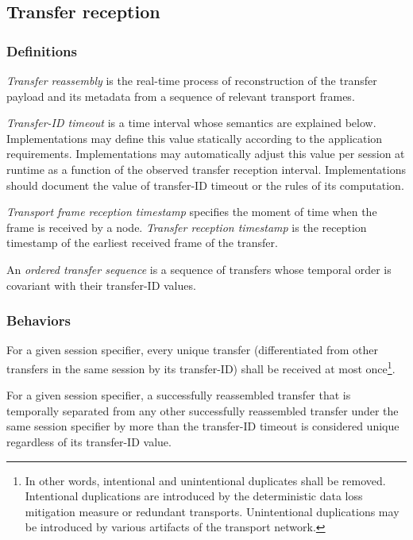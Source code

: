 \subsection{Transfer reception}\label{sec:transport_transfer_reception}

\subsubsection{Definitions}

\emph{Transfer reassembly} is the real-time process of reconstruction of the transfer payload and its metadata from
a sequence of relevant transport frames.

\emph{Transfer-ID timeout} is a time interval whose semantics are explained below.
Implementations may define this value statically according to the application requirements.
Implementations may automatically adjust this value per session at runtime as a function of the
observed transfer reception interval.
Implementations should document the value of transfer-ID timeout or the rules of its computation.

\emph{Transport frame reception timestamp} specifies the moment of time when the frame is received by a node.
\emph{Transfer reception timestamp} is the reception timestamp of the earliest received frame of the transfer.

An \emph{ordered transfer sequence} is a sequence of transfers whose temporal order is
covariant with their transfer-ID values.

\subsubsection{Behaviors}

For a given session specifier, every unique transfer
(differentiated from other transfers in the same session by its transfer-ID)
shall be received at most once\footnote{%
    In other words, intentional and unintentional duplicates shall be removed.
    Intentional duplications are introduced by the deterministic data loss mitigation measure or redundant transports.
    Unintentional duplications may be introduced by various artifacts of the transport network.
}.

For a given session specifier, a successfully reassembled transfer that is
temporally separated from any other successfully reassembled transfer under the same session specifier
by more than the transfer-ID timeout is considered unique regardless of its transfer-ID value.

